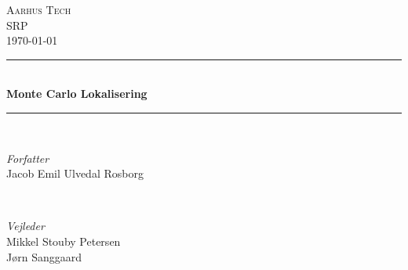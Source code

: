 \documentclass[../SRP.tex]{subfiles}
\begin{document}
\begin{titlepage}
  \newcommand{\HRule}{\rule{\linewidth}{0.5mm}}

	\center

	\textsc{\LARGE Aarhus Tech} \\[0.25cm]
  \textsc{\Large SRP} \\[0.5cm]



  {\large\today}
  \\[1cm]

	\HRule\\[0.4cm]
	{\huge\bfseries Monte Carlo Lokalisering}\\[0.1cm]

	\HRule\\[1.5cm]

	\begin{minipage}{0.4\textwidth}
		\begin{flushleft}
			\large
			\textit{Forfatter}\\
			Jacob Emil Ulvedal Rosborg %
		\end{flushleft}
	\end{minipage}
	~
	\begin{minipage}{0.4\textwidth}
		\begin{flushright}
			\large
			\textit{Vejleder}\\
			Mikkel Stouby Petersen\\
			Jørn Sanggaard
		\end{flushright}
	\end{minipage}\\[4.0cm]


\end{titlepage}
\end{document}
